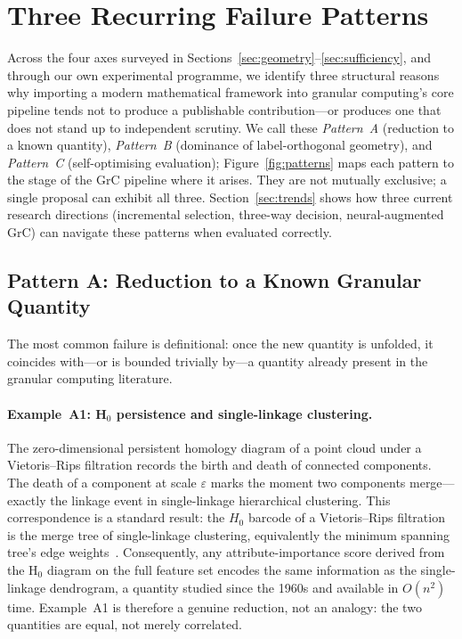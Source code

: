 \section{Three Recurring Failure Patterns}
\label{sec:failure}

Across the four axes surveyed in Sections~\ref{sec:geometry}--\ref{sec:sufficiency},
and through our own experimental programme, we identify three structural reasons
why importing a modern mathematical framework into granular computing's core
pipeline tends not to produce a publishable contribution---or produces one that
does not stand up to independent scrutiny.  We call these \emph{Pattern~A}
(reduction to a known quantity), \emph{Pattern~B} (dominance of
label-orthogonal geometry),
and \emph{Pattern~C} (self-optimising evaluation); Figure~\ref{fig:patterns}
maps each pattern to the stage of the GrC pipeline where it arises.
They are not mutually exclusive; a single proposal can exhibit all three.
Section~\ref{sec:trends} shows how three current research directions
(incremental selection, three-way decision, neural-augmented GrC) can
navigate these patterns when evaluated correctly.

\subsection{Pattern A: Reduction to a Known Granular Quantity}
\label{sec:patA}

The most common failure is definitional: once the new quantity is unfolded,
it coincides with---or is bounded trivially by---a quantity already present
in the granular computing literature.

\paragraph{Example~A1: H$_0$ persistence and single-linkage clustering.}
The zero-dimensional persistent homology diagram of a point cloud under a
Vietoris--Rips filtration records the birth and death of connected components.
The death of a component at scale $\varepsilon$ marks the moment two
components merge---exactly the linkage event in single-linkage hierarchical
clustering.  This correspondence is a standard result: the $H_0$ barcode
of a Vietoris--Rips filtration is the merge tree of single-linkage
clustering, equivalently the minimum spanning tree's edge
weights~\cite{CarlssonMemoli2010hierarchical,Chazal2013persistenceclustering}.
Consequently, any attribute-importance score derived from the
H$_0$ diagram on the full feature set encodes the same information as the
single-linkage dendrogram, a quantity studied since the 1960s and available
in $O(n^2)$ time.  Example~A1 is therefore a genuine reduction, not an
analogy: the two quantities are equal, not merely correlated.

